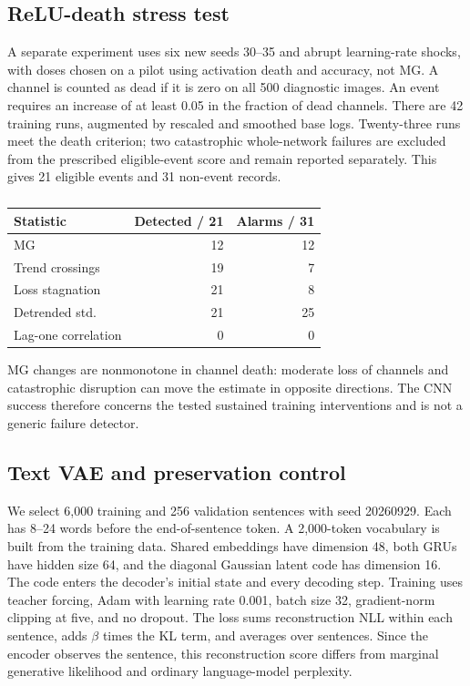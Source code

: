{\subsection{ReLU-death stress test}
A separate experiment uses six new seeds 30--35 and abrupt learning-rate shocks, with doses chosen on a pilot using activation death and accuracy, not MG. A channel is counted as dead if it is zero on all 500 diagnostic images. An event requires an increase of at least 0.05 in the fraction of dead channels. There are 42 training runs, augmented by rescaled and smoothed base logs. Twenty-three runs meet the death criterion; two catastrophic whole-network failures are excluded from the prescribed eligible-event score and remain reported separately. This gives 21 eligible events and 31 non-event records.

\begin{table}[h]
\centering\small
\caption{}
\begin{tabular}{lrr}
\toprule
Statistic & Detected / 21 & Alarms / 31 \\
\midrule
MG & 12 & 12 \\
Trend crossings & 19 & 7 \\
Loss stagnation & 21 & 8 \\
Detrended std. & 21 & 25 \\
Lag-one correlation & 0 & 0 \\
\bottomrule
\end{tabular}
\end{table}
MG changes are nonmonotone in channel death: moderate loss of channels and catastrophic disruption can move the estimate in opposite directions. The CNN success therefore concerns the tested sustained training interventions and is not a generic failure detector.

\subsection{Text VAE and preservation control}
We select 6,000 training and 256 validation sentences with seed 20260929. Each has 8--24 words before the end-of-sentence token. A 2,000-token vocabulary is built from the training data. Shared embeddings have dimension 48, both GRUs have hidden size 64, and the diagonal Gaussian latent code has dimension 16. The code enters the decoder's initial state and every decoding step. Training uses teacher forcing, Adam with learning rate 0.001, batch size 32, gradient-norm clipping at five, and no dropout. The loss sums reconstruction NLL within each sentence, adds $\beta$ times the KL term, and averages over sentences. Since the encoder observes the sentence, this reconstruction score differs from marginal generative likelihood and ordinary language-model perplexity.

}
